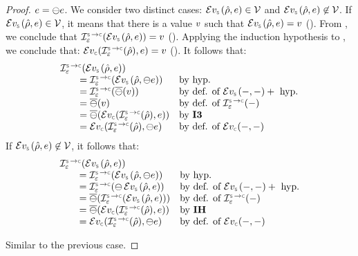 \begin{proof}
\noindent {} $e = \ominus e$. We consider two distinct cases: 
$\evalexpr{\symbolic}(\sstore, \jsilexpr) \in \vals$ and $\evalexpr{\symbolic}(\sstore, \jsilexpr) \not\in \vals$. 
If $\evalexpr{\symbolic}(\sstore, \jsilexpr) \in \vals$, it means that there is a value $v$ such 
that  $\evalexpr{\symbolic}(\sstore, \jsilexpr) = \val$ (). From , we conclude that 
$\interpret{\symbconc}{\senv}(\evalexpr{\symbolic}(\sstore, \jsilexpr)) = \val$ (). 
Applying the induction hypothesis to , we conclude that: 
$\evalexpr{\concrete}(\interpret{\symbconc}{\senv}(\sstore), \jsilexpr) = \val$ (). 
It follows that: 
$$
\begin{array}{lll}
  \interpret{\symbconc}{\senv}(\evalexpr{\symbolic}(\sstore, \jsilexpr))  & \\
       \qquad =  \interpret{\symbconc}{\senv}(\evalexpr{\symbolic}(\sstore, \ominus \jsilexpr)) & \text{by hyp.} \\   
      \qquad =  \interpret{\symbconc}{\senv}(\semop{\ominus}(\val))  & \text{by def. of } \evalexpr{\symbolic}(-, -) + \text{ hyp.} \\ 
      \qquad =  \semop{\ominus}(\val)   & \text{by def. of } \interpret{\symbconc}{\senv}(-) \\ 
      \qquad =  \semop{\ominus}(\evalexpr{\concrete}(\interpret{\symbconc}{\senv}(\sstore), \jsilexpr))   & \text{by \ieq{3}}\\ 
      \qquad = \evalexpr{\concrete}(\interpret{\symbconc}{\senv}(\sstore), \ominus \jsilexpr)  & \text{by def. of } \evalexpr{\concrete}(-, -) 
\end{array}
$$
If $\evalexpr{\symbolic}(\sstore, \jsilexpr) \not\in \vals$, it follows that: 
$$
\begin{array}{lll}
  \interpret{\symbconc}{\senv}(\evalexpr{\symbolic}(\sstore, \jsilexpr))  & \\ 
    \qquad   =  \interpret{\symbconc}{\senv}(\evalexpr{\symbolic}(\sstore, \ominus \jsilexpr)) & \text{by hyp.} \\  
      \qquad =  \interpret{\symbconc}{\senv}(\ominus \, \evalexpr{\symbolic}(\sstore, \jsilexpr))  & \text{by def. of } \evalexpr{\symbolic}(-, -) + \text{ hyp.} \\ 
      \qquad =  \semop{\ominus}(\interpret{\symbconc}{\senv}(\evalexpr{\symbolic}(\sstore, \jsilexpr)))   & \text{by def. of } \interpret{\symbconc}{\senv}(-) \\
      \qquad =  \semop{\ominus}(\evalexpr{\concrete}(\interpret{\symbconc}{\senv}(\sstore), \jsilexpr))   & \text{by \indhyp}\\
    \qquad   = \evalexpr{\concrete}(\interpret{\symbconc}{\senv}(\sstore), \ominus \jsilexpr)  & \text{by def. of } \evalexpr{\concrete}(-, -) 
\end{array}
$$

\noindent {} Similar to the previous case. 
\end{proof}

